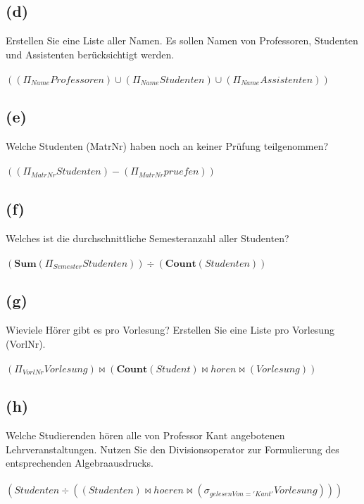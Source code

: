 \documentclass{article}
\begin{document}
\subsection{(d)}
Erstellen Sie eine Liste aller Namen. Es sollen Namen von Professoren,
Studenten und Assistenten berücksichtigt werden. \\\\
$((\Pi_{Name} Professoren) \cup (\Pi_{Name} Studenten) \cup (\Pi_{Name} Assistenten))$

\subsection{(e)}
Welche Studenten (MatrNr) haben noch an keiner Prüfung teilgenommen?\\\\
$((\Pi_{MatrNr} Studenten) - (\Pi_{MatrNr} pruefen))$\\

\newpage
\subsection{(f)}
Welches ist die durchschnittliche Semesteranzahl aller Studenten?\\\\
$(\textbf{Sum}(\Pi_{Semester} Studenten)) \div  (\textbf{Count}(Studenten))$\\

\subsection{(g)}
Wieviele Hörer gibt es pro Vorlesung? Erstellen Sie eine Liste pro Vorlesung (VorlNr).\\\\
$(\Pi_{VorlNr} Vorlesung) \bowtie (\textbf{Count}(Student) \bowtie horen \bowtie (Vorlesung)) $


\subsection{(h)}
Welche Studierenden hören alle von Professor Kant angebotenen Lehrveranstaltungen. 
Nutzen Sie den Divisionsoperator zur Formulierung des entsprechenden Algebraausdrucks. \\\\

$ (Studenten \div ((Studenten) \bowtie hoeren \bowtie (\sigma_{gelesenVon='Kant'} Vorlesung)))$
\end{document}
